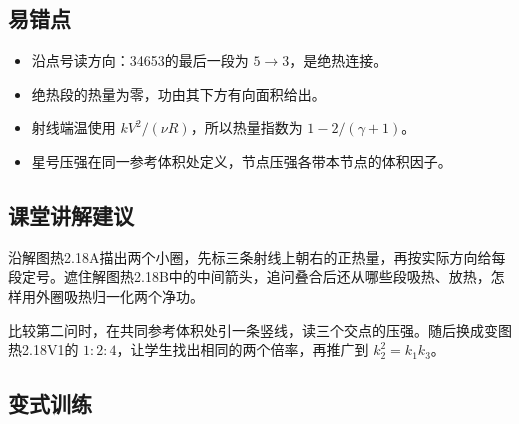 \documentclass[UTF8,fontset=fandol,a4paper,11pt]{ctexart}
\begin{document}


\subsection*{易错点}

\begin{itemize}
\item 沿点号读方向：34653的最后一段为 $5\to3$，是绝热连接。
\item 绝热段的热量为零，功由其下方有向面积给出。
\item 射线端温使用 $kV^2/(\nu R)$，所以热量指数为 $1-2/(\gamma+1)$。
\item 星号压强在同一参考体积处定义，节点压强各带本节点的体积因子。
\end{itemize}



\subsection*{课堂讲解建议}

沿解图热2.18A描出两个小圈，先标三条射线上朝右的正热量，再按实际方向给每段定号。遮住解图热2.18B中的中间箭头，追问叠合后还从哪些段吸热、放热，怎样用外圈吸热归一化两个净功。

比较第二问时，在共同参考体积处引一条竖线，读三个交点的压强。随后换成变图热2.18V1的 $1:2:4$，让学生找出相同的两个倍率，再推广到 $k_2^2=k_1k_3$。



\subsection*{变式训练}
\end{document}
